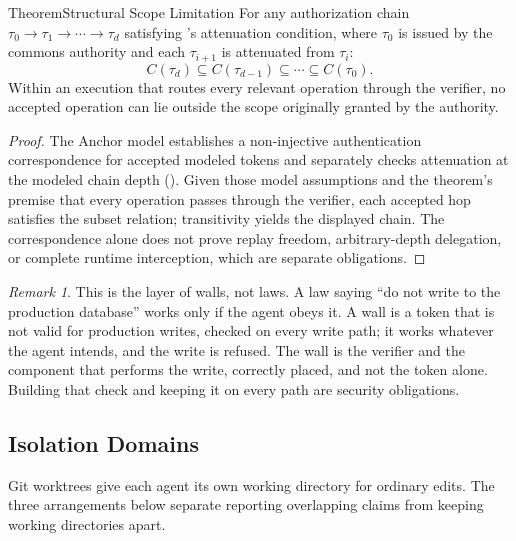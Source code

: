 \documentclass[11pt,a4paper]{article}
\theoremstyle{definition}
\theoremstyle{remark}
\newtheorem*{remark}{Remark}
\begin{document}
\begin{pdclaim}{Theorem}{Structural Scope Limitation}
\setlength{\parskip}{4pt plus 1pt}
\label{thm:scope}
For any authorization chain $\tau_0 \rightarrow \tau_1 \rightarrow \cdots \rightarrow \tau_d$ satisfying 's attenuation condition, where $\tau_0$ is issued by the commons authority and each $\tau_{i+1}$ is attenuated from $\tau_i$:
\[
C(\tau_d) \subseteq C(\tau_{d-1}) \subseteq \cdots \subseteq C(\tau_0).
\]
Within an execution that routes every relevant operation through the verifier, no
accepted operation can lie outside the scope originally granted by the authority.
\end{pdclaim}

\begin{proof}
\setlength{\parskip}{4pt plus 1pt}
The Anchor model establishes a non-injective authentication correspondence for accepted modeled tokens and separately checks attenuation at the modeled chain depth (). Given those model assumptions and the theorem's premise that every operation passes through the verifier, each accepted hop satisfies the subset relation; transitivity yields the displayed chain. The correspondence alone does not prove replay freedom, arbitrary-depth delegation, or complete runtime interception, which are separate obligations.
\end{proof}

\begin{remark}
This is the layer of walls, not laws. A law saying ``do not write to the production database'' works only if the agent obeys it. A wall is a token that is not valid for production writes, checked on every write path; it works whatever the agent intends, and the write is refused. The wall is the verifier and the component that performs the write, correctly placed, and not the token
alone. Building that check and keeping it on every path are security obligations.
\end{remark}

\pdexercisepointerone{\ref{ex:bonded-cap-attenuation}}{\pageref{ex:bonded-cap-attenuation}}

\subsection{Isolation Domains}\label{sec:isolation}

Git worktrees give each agent its own working directory for ordinary edits.
The three arrangements below separate reporting overlapping claims from
keeping working directories apart.
\end{document}
